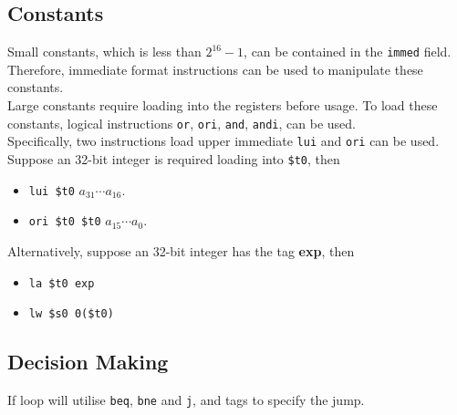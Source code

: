 \documentclass[12pt]{article}
\theoremstyle{definition}
\begin{document}
\subsection{Constants}
Small constants, which is less than $2^16-1$, can be contained in the \texttt{immed} field. Therefore, immediate format instructions can be used to manipulate these constants.\\
Large constants require loading into the registers before usage. To load these constants, logical instructions \texttt{or}, \texttt{ori}, \texttt{and}, \texttt{andi}, can be used.\\Specifically, two instructions load upper immediate \texttt{lui} and \texttt{ori} can be used. Suppose an 32-bit integer is required loading into \texttt{\$t0}, then
\begin{itemize}
  \item \texttt{lui \$t0} $a_{31}\cdots a_{16}$.
  \item \texttt{ori \$t0 \$t0} $a_{15}\cdots a_0$.
\end{itemize}
Alternatively, suppose an 32-bit integer has the tag \textbf{exp}, then
\begin{itemize}
  \item \texttt{la \$t0 exp}
  \item \texttt{lw \$s0 0(\$t0)}
\end{itemize}
\subsection{Decision Making} 
If loop will utilise \texttt{beq}, \texttt{bne} and \texttt{j}, and tags to specify the jump.
\clearpage

\end{document}
